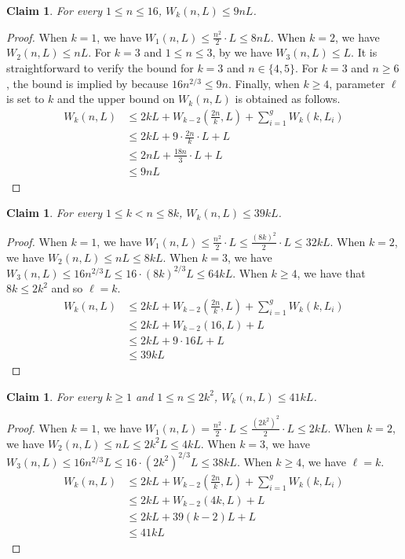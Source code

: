 \documentclass[11pt,english]{article}
\newtheorem{claim}[theorem]{Claim}
\begin{document}
\begin{claim} 
For every $1\le n \le 16$, $W_k(n, L) \le 9nL$.
\end{claim}
\begin{proof}
When $k=1$, we have $W_1(n, L) \le \frac{n^2}{2}\cdot L \le 8n L$.
When $k=2$, we have $W_2(n, L) \le nL$.
For $k = 3$ and $1 \le n \le 3$, by  we have $W_3(n,L) \le L$. It is straightforward to verify the bound for  $k=3$ and $n \in \{4, 5\}$. For $k=3$ and $n\ge 6$, the bound is implied by  because $16n^{2/3} \le 9n$. Finally, when $k\ge 4$, parameter $\ell$ is set to $k$ and the upper bound on $W_k(n,L)$ is obtained as follows.
\begin{align*}
W_k(n,L) &\le 2k L + W_{k-2}\left(\frac{2n}{k}, L\right) + \sum_{i=1}^g W_k(k, L_i)\\
& \le 2k L + 9 \cdot \frac{2n}{k} \cdot L + L\\
& \le 2n L + \frac{18n}{3} \cdot L + L \\
& \le 9n L
\end{align*}
\end{proof}
\begin{claim}
For every $1\le k < n \le 8k$, $W_k(n, L) \le 39kL$.
\end{claim}
\begin{proof}
When $k=1$, we have $W_1(n,L) \le \frac{n^2}{2}\cdot L \le \frac{(8k)^2}{2}\cdot L \le 32kL$.
When $k=2$, we have $W_2(n, L) \le nL \le 8kL$.
When $k=3$, we have $W_3(n, L) \le 16n^{2/3}L \le 16 \cdot (8k)^{2/3}L\le 64kL$.
When $k \ge 4$, we have that $8k \le 2k^2$ and so $\ell = k$.
\begin{align*}
W_k(n,L) &\le 2k L + W_{k-2}\left(\frac{2n}{k}, L\right) + \sum_{i=1}^g W_k(k, L_i)\\
&\le 2k L + W_{k-2}(16,L) + L\\
&\le 2kL + 9\cdot 16L + L\\
&\le 39kL
\end{align*}
\end{proof}

\begin{claim}
For every $k\ge 1$ and $1 \le n \le 2k^2$, $W_k(n, L) \le 41kL$.
\end{claim}
\begin{proof}
When $k=1$, we have $W_1(n,L) = \frac{n^2}{2}\cdot L \le \frac{(2k^2)^2}{2}\cdot L \le 2kL$.
When $k=2$, we have $W_2(n, L) \le nL \le 2k^2L \le 4kL$.
When $k=3$, we have $W_3(n, L) \le 16n^{2/3}L \le 16\cdot (2k^2)^{2/3}L \le 38kL$.
When $k \ge 4$, we have $\ell = k$.
\begin{align*}
W_k(n,L) &\le 2k L + W_{k-2}\left(\frac{2n}{k}, L\right) + \sum_{i=1}^g W_k(k, L_i)\\
& \le 2kL + W_{k-2}(4k, L) + L\\
& \le 2kL + 39(k-2)L + L\\
& \le 41kL
\end{align*}
\end{proof}
\end{document}
